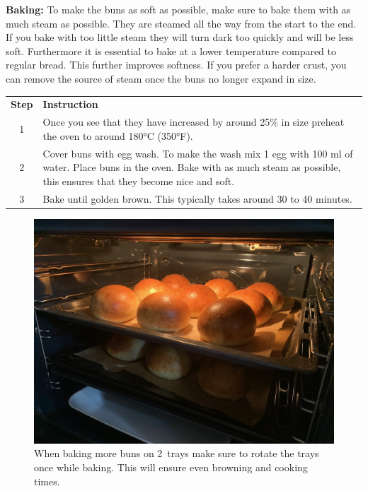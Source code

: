 \noindent\textbf{Baking:}
To make the buns as soft as possible, make sure to bake them with as much steam
as possible. They are steamed all the way from the start to the end. If you
bake with too little steam they will turn dark too quickly and will be less
soft. Furthermore it is essential to bake at a lower temperature compared to
regular bread. This further improves softness. If you prefer a harder crust,
you can remove the source of steam once the buns no longer expand in size.

\begin{center}
\begin{tabular}{|c|p{12cm}|}
    \hline
    \textbf{Step} & \textbf{Instruction} \\
    1 & Once you see that they have increased by around 25\% in size preheat
    the oven to around 180°C (350°F). \\
    \hline
    2 & Cover buns with egg wash. To make the wash mix 1 egg with 100 ml of
    water. Place buns in the oven. Bake with as much steam as possible, this
    ensures that they become nice and soft. \\
    \hline
    3 & Bake until golden brown. This typically takes around 30 to 40 minutes. \\
    \hline
\end{tabular}
\end{center}

\begin{figure}[h]
    \centering
    \includegraphics[width=\textwidth]{brioche-buns-baking}
    \caption{When baking more buns on 2~trays make sure to rotate the trays
    once while baking. This will ensure even browning and cooking times.}
\end{figure}
